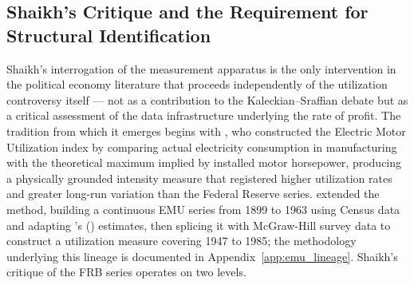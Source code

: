 \documentclass[11pt,a4paper]{article}
\begin{document}

\subsection{Shaikh's Critique and the Requirement for Structural Identification}
\label{sec:24_shaikh_structuralid}


Shaikh's interrogation of the measurement apparatus is the only intervention
in the political economy literature that proceeds independently of the
utilization controversy itself --- not as a contribution to the
Kaleckian--Sraffian debate but as a critical assessment of the data
infrastructure underlying the rate of profit. The tradition from which it
emerges begins with \citet{Foss1963}, who constructed the Electric Motor
Utilization index by comparing actual electricity consumption in
manufacturing with the theoretical maximum implied by installed motor
horsepower, producing a physically grounded intensity measure that registered
higher utilization rates and greater long-run variation than the Federal
Reserve series. \citet{Shaikh1992} extended the method, building a
continuous EMU series from 1899 to 1963 using Census data and adapting
\citeauthor{Christensen1969}'s (\citeyear{Christensen1969}) estimates, then
splicing it with McGraw-Hill survey data to construct a utilization measure
covering 1947 to 1985; the methodology underlying this lineage is
documented in Appendix~\ref{app:emu_lineage}. Shaikh's critique of the FRB
series operates on two levels. 
\end{document}
